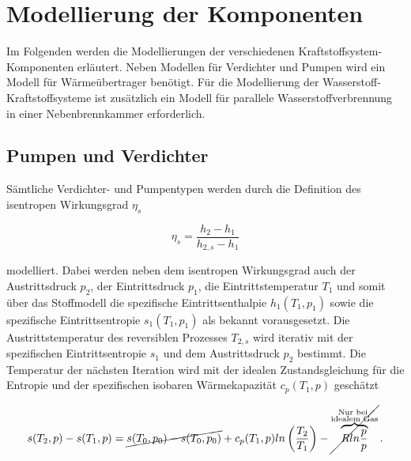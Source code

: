 



\section{Modellierung der Komponenten}

Im Folgenden werden die Modellierungen der verschiedenen Kraftstoffsystem-Komponenten erläutert. Neben Modellen für Verdichter und Pumpen wird ein Modell für Wärmeübertrager benötigt. Für die Modellierung der Wasserstoff-Kraftstoffsysteme ist zusätzlich ein Modell für parallele Wasserstoffverbrennung in einer Nebenbrennkammer erforderlich. 

\subsection{Pumpen und Verdichter}

Sämtliche Verdichter- und Pumpentypen werden durch die Definition des isentropen Wirkungsgrad $\eta_s$

\begin{equation}\label{Eq:isentropic}
	\eta_s=\frac{h_2-h_1}{h_{2,s}-h_1}
\end{equation}

modelliert. Dabei werden neben dem isentropen Wirkungsgrad auch der Austrittsdruck $p_2$, der Eintrittsdruck $p_1$, die Eintrittstemperatur $T_1$ und somit über das Stoffmodell die spezifische Eintrittsenthalpie $h_1(T_1, p_1)$ sowie die spezifische Eintrittsentropie $s_1(T_1, p_1)$ als bekannt vorausgesetzt. Die Austrittstemperatur des reversiblen Prozesses $T_{2,s}$ wird iterativ mit der spezifischen Eintrittsentropie $s_1$ und dem Austrittsdruck $p_2$ bestimmt. Die Temperatur der nächsten Iteration wird mit der idealen Zustandsgleichung für die Entropie und der spezifischen isobaren Wärmekapazität $c_p(T_1,p)$ geschätzt 

\begin{equation}\label{Eq:entropy}
	s(T_2,p)-s(T_1, p)=\cancel{s(T_0,p_0) - s(T_0,p_0)} + c_p(T_1,p) ln\left(\frac{T_2}{T_1}\right) - {\cancel{\overbrace{R ln\frac{p}{p}}^{\substack{\text{Nur bei } \\ \text{idealem Gas}}}}}\,.
\end{equation}


